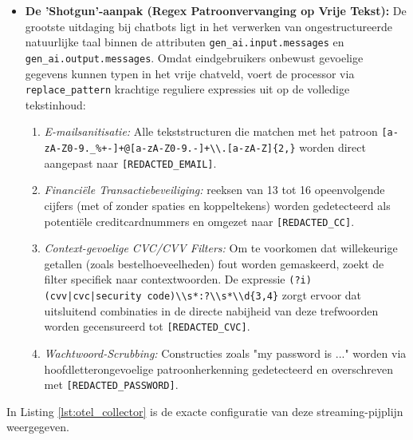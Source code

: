 \begin{itemize}
    \item \textbf{De 'Shotgun'-aanpak (Regex Patroonvervanging op Vrije Tekst):} 
    De grootste uitdaging bij chatbots ligt in het verwerken van ongestructureerde natuurlijke taal binnen de attributen \texttt{gen\_ai.input.messages} en \texttt{gen\_ai.output.messages}. Omdat eindgebruikers onbewust gevoelige gegevens kunnen typen in het vrije chatveld, voert de processor via \texttt{replace\_pattern} krachtige reguliere expressies uit op de volledige tekstinhoud:
    \begin{enumerate}
        \item \textit{E-mailsanitisatie:} Alle tekststructuren die matchen met het patroon \texttt{[a-zA-Z0-9.\_\%+-]+@[a-zA-Z0-9.-]+\textbackslash \textbackslash .[a-zA-Z]\{2,\}} worden direct aangepast naar \texttt{[REDACTED\_EMAIL]}.
        \item \textit{Financiële Transactiebeveiliging:} reeksen van 13 tot 16 opeenvolgende cijfers (met of zonder spaties en koppeltekens) worden gedetecteerd als potentiële creditcardnummers en omgezet naar \texttt{[REDACTED\_CC]}.
        \item \textit{Context-gevoelige CVC/CVV Filters:} Om te voorkomen dat willekeurige getallen (zoals bestelhoeveelheden) fout worden gemaskeerd, zoekt de filter specifiek naar contextwoorden. De expressie \texttt{(?i)(cvv|cvc|security code)\textbackslash \textbackslash s*:?\textbackslash \textbackslash s*\textbackslash \textbackslash d\{3,4\}} zorgt ervoor dat uitsluitend combinaties in de directe nabijheid van deze trefwoorden worden gecensureerd tot \texttt{[REDACTED\_CVC]}.
        \item \textit{Wachtwoord-Scrubbing:} Constructies zoals "my password is ..." worden via hoofdletterongevoelige patroonherkenning gedetecteerd en overschreven met \texttt{[REDACTED\_PASSWORD]}.
    \end{enumerate}
\end{itemize}

In Listing \ref{lst:otel_collector} is de exacte configuratie van deze streaming-pijplijn weergegeven.


